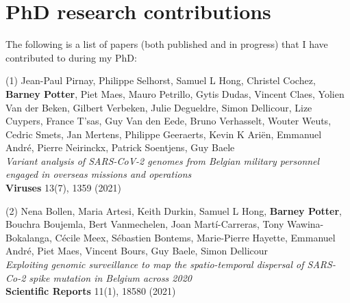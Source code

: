 \chapter{PhD research contributions}
\label{ch:papersAppendix}

The following is a list of papers (both published and in progress) that I have contributed to during my PhD:

(1) Jean-Paul Pirnay, Philippe Selhorst, Samuel L Hong, Christel Cochez, \textbf{Barney Potter}, Piet Maes, Mauro Petrillo, Gytis Dudas, Vincent Claes, Yolien Van der Beken, Gilbert Verbeken, Julie Degueldre, Simon Dellicour, Lize Cuypers, France T’sas, Guy Van den Eede, Bruno Verhasselt, Wouter Weuts, Cedric Smets, Jan Mertens, Philippe Geeraerts, Kevin K Ariën, Emmanuel André, Pierre Neirinckx, Patrick Soentjens, Guy Baele\\
\textit{Variant analysis of SARS-CoV-2 genomes from Belgian military personnel engaged in overseas missions and operations}\\
\textbf{Viruses} 13(7), 1359 (2021)

(2) Nena Bollen, Maria Artesi, Keith Durkin, Samuel L Hong, \textbf{Barney Potter}, Bouchra Boujemla, Bert Vanmechelen, Joan Martí-Carreras, Tony Wawina-Bokalanga, Cécile Meex, Sébastien Bontems, Marie-Pierre Hayette, Emmanuel André, Piet Maes, Vincent Bours, Guy Baele, Simon Dellicour\\
\textit{Exploiting genomic surveillance to map the spatio-temporal dispersal of SARS-Co-2 spike mutation in Belgium across 2020}\\
\textbf{Scientific Reports} 11(1), 18580 (2021)

